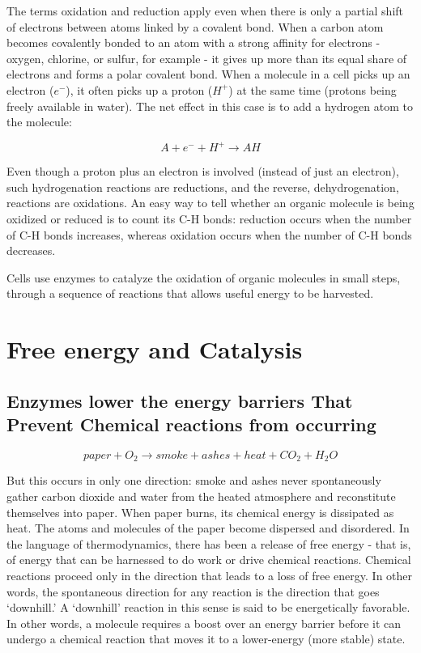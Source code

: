 The terms oxidation and reduction apply even when there is only a partial
shift of electrons between atoms linked by a covalent bond. When a
carbon atom becomes covalently bonded to an atom with a strong affinity
for electrons - oxygen, chlorine, or sulfur, for example - it gives up more
than its equal share of electrons and forms a polar covalent bond.
When a molecule in a cell picks up an electron ($e^{-}$), it often picks up a
proton ($H^{+}$) at the same time (protons being freely available in water).
The net effect in this case is to add a hydrogen atom to the molecule:

\begin{equation}
A + e^{-} +  H^{+} \rightarrow AH
\end{equation}

Even though a proton plus an electron is involved (instead of just an
electron), such hydrogenation reactions are reductions, and the reverse,
dehydrogenation, reactions are oxidations. An easy way to tell whether an
organic molecule is being oxidized or reduced is to count its C-H bonds:
reduction occurs when the number of C-H bonds increases, whereas oxidation
occurs when the number of C-H bonds decreases.

Cells use enzymes to catalyze the oxidation of organic molecules in small steps,
through a sequence of reactions that allows useful energy to be harvested.

\section{Free energy and Catalysis}

\subsection{Enzymes lower the energy barriers That Prevent Chemical reactions from occurring}

\begin{equation}
paper + O_{2} \rightarrow smoke + ashes + heat + CO_{2} + H_{2}O
\end{equation}

But this occurs in only one direction: smoke and ashes never spontaneously
gather carbon dioxide and water from the heated atmosphere and
reconstitute themselves into paper. When paper burns, its chemical
energy is dissipated as heat. The atoms
and molecules of the paper become dispersed and disordered. In the
language of thermodynamics, there has been a release of free energy -
that is, of energy that can be harnessed to do work or drive chemical
reactions. Chemical reactions proceed only in the direction that leads to
a loss of free energy. In other words, the spontaneous direction for any
reaction is the direction that goes ‘downhill.’ A ‘downhill’ reaction in this
sense is said to be energetically favorable.
In other words, a molecule requires a boost over an energy barrier
before it can undergo a chemical reaction that moves it to a lower-energy
(more stable) state.

